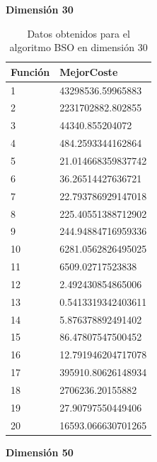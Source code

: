 \newpage
\textbf{Dimensión 30}
\begin{table}[htbp]
	\begin{center}
		\begin{tabular}{|l|l|}
			\hline
			Función & MejorCoste \\
			\hline \hline
			1 & 43298536.59965883 \\ \hline
			2 & 2231702882.802855 \\ \hline
			3 & 44340.855204072 \\ \hline
			4 & 484.2593344162864 \\ \hline
			5 & 21.014668359837742 \\ \hline
			6 & 36.26514427636721 \\ \hline
			7 & 22.793786929147018 \\ \hline
			8 & 225.40551388712902 \\ \hline
			9 & 244.94884716959336 \\ \hline
			10 & 6281.0562826495025 \\ \hline
			11 & 6509.02717523838 \\ \hline
			12 & 2.492430854865006 \\ \hline
			13 & 0.5413319342403611 \\ \hline
			14 & 5.876378892491402 \\ \hline
			15 & 86.47807547500452 \\ \hline
			16 & 12.791946204717078 \\ \hline
			17 & 395910.80626148934 \\ \hline
			18 & 2706236.20155882 \\ \hline
			19 & 27.90797550449406 \\ \hline
			20 & 16593.066630701265 \\ \hline

\end{tabular}
\caption{Datos obtenidos para el algoritmo BSO en dimensión 30}
\label{tabla:Dimension30}
\end{center}
\end{table}

\newpage

\textbf{Dimensión 50}

